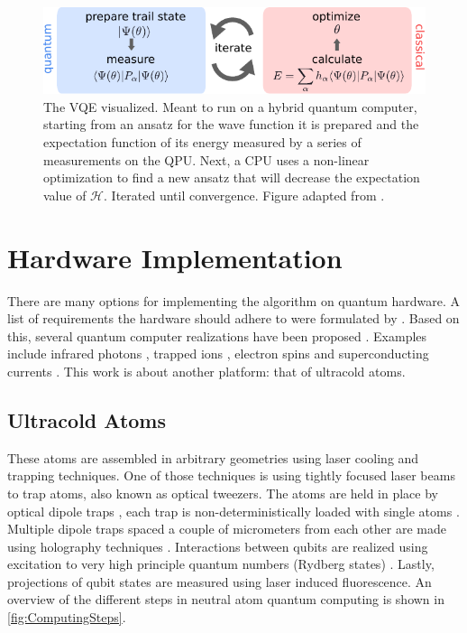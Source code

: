 \begin{figure}
	\centering
	\includegraphics[width=0.75\linewidth]{figures/VQE.pdf}
	\caption{The \ac{VQE} visualized. 
	Meant to run on a hybrid quantum computer, starting from an ansatz for the wave function it is prepared and the expectation function of its energy measured by a series of measurements on the \ac{QPU}.
	Next, a CPU uses a non-linear optimization to find a new ansatz that will decrease the expectation value of $\mathcal{H}$. Iterated until convergence. Figure adapted from \cite{Moll2018}.}
	\label{fig:VQE}
\end{figure}

\section{Hardware Implementation}

There are many options for implementing the algorithm on quantum hardware.
A list of requirements the hardware should adhere to were formulated by \cite{DiVincenzo2000} .
Based on this, several quantum computer realizations have been proposed \cite{Ladd2010}.
Examples include infrared photons \cite{Matthews2009}, trapped ions \cite{Benhelm2008,Schindler2013}, electron spins \cite{Press2008} and superconducting currents \cite{DiCarlo2009,Arute2019}. 
This work is about another platform: that of ultracold atoms.

\subsection{Ultracold Atoms}


These atoms are assembled in arbitrary geometries using laser cooling and trapping techniques. 
One of those techniques is using tightly focused laser beams to trap atoms, also known as optical tweezers.
The atoms are held in place by optical dipole traps \cite{Chu1986}, each trap is non-deterministically loaded with single atoms \cite{Schlosser2001}. 
Multiple dipole traps spaced a couple of micrometers from each other are made using holography techniques \cite{Bergamini2004}.
Interactions between qubits are realized using excitation to very high principle quantum numbers (Rydberg states) \cite{Levine2018,Madjarov2020}. 
Lastly, projections of qubit states are measured using laser induced fluorescence. 
An overview of the different steps in neutral atom quantum computing is shown in \cref{fig:ComputingSteps}.


